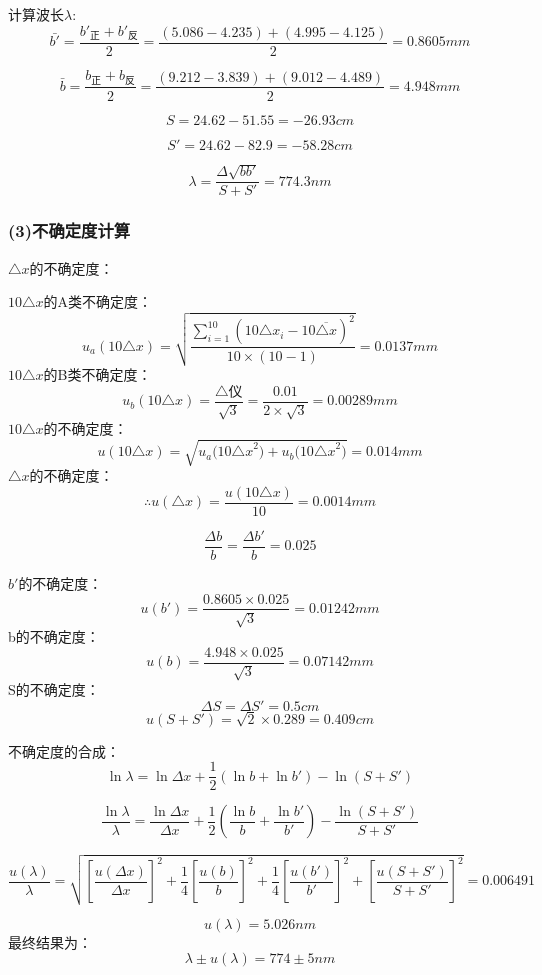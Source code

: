 \documentclass[11pt,a4paper,oneside]{article}
\begin{document}
计算波长$\lambda$:
$$\bar{b'} = \displaystyle\frac{b'_\text{正}+b'_\text{反}}{2} = \displaystyle\frac{ (5.086-4.235)+(4.995-4.125)}{2} = 0.8605mm$$

$$\bar{b} = \displaystyle\frac{b_\text{正}+b_\text{反}}{2} = \displaystyle\frac{ (9.212-3.839)+(9.012-4.489)}{2} = 4.948mm$$

$$ S = 24.62 - 51.55 = -26.93cm$$

$$ S' = 24.62 - 82.9 = -58.28cm$$

$$ {\lambda} = \displaystyle\frac{{\Delta}\sqrt{bb'}}{S+S'} = 774.3nm$$

\subsubsection*{(3)不确定度计算}
${\triangle}x$的不确定度：

$10{\triangle}x$的A类不确定度：
$$u_a(10{\triangle}x) = \sqrt{\displaystyle\frac{\sum\limits_{i=1}^{10} (10{{\triangle}x}_i-{10\overline{{\triangle}x}})^2}{10{\times}(10-1)}} = 0.0137mm$$
$10{\triangle}x$的B类不确定度：
$$u_b({10{\triangle}x})=\displaystyle\frac{\bigtriangleup\text{仪}}{\sqrt{3}}
= \frac{0.01}{2{\times}\sqrt{3}} = 0.00289mm$$
$10{\triangle}x$的不确定度：
$$u(10{\triangle}x)=\sqrt{{u_a(10{\triangle}x}^2)+{u_b(10{\triangle}x}^2)} = 0.014mm$$
${\triangle}x$的不确定度：
$${\therefore}u({\triangle}x) = \displaystyle\frac{u(10{\triangle}x)}{10} = 0.0014mm$$

$$ \displaystyle\frac{{\Delta}b}{b} = \displaystyle\frac{{\Delta}b'}{b} = 0.025 $$

$b'$的不确定度：
$$ u(b') = \displaystyle\frac{ 0.8605{\times}0.025}{\sqrt{3}} =0.01242mm$$
b的不确定度：
$$ u(b) = \displaystyle\frac{ 4.948{\times}0.025}{\sqrt{3}} =0.07142mm$$
S的不确定度：
$${\Delta}S = {\Delta}S' = 0.5cm$$
$$ u(S+S') = \sqrt{2} {\times} 0.289 = 0.409cm$$

不确定度的合成：
$$ \ln{\lambda} = \ln{{\Delta}x}+ \displaystyle\frac{1}{2}(\ln{b}+\ln{b'}) - \ln(S+S')$$

$$\displaystyle\frac{\ln{\lambda}}{\lambda} = \displaystyle\frac{\ln{\Delta}x}{{\Delta}x}+\displaystyle\frac{1}{2}(\displaystyle\frac{\ln{b}}{b}+\displaystyle\frac{\ln{b'}}{b'}) - \displaystyle\frac{\ln{(S+S')}}{S+S'} $$

$$\displaystyle\frac{u({\lambda})}{\lambda} = \sqrt{ [{\frac{u({\Delta}x)}{{\Delta}x}}]^2+\frac{1}{4}[{\frac{u(b)}{b}}]^2 +\frac{1}{4}[{\frac{u(b')}{b'}}]^2 + [\frac{u(S+S')}{S+S'}]^2   } = 0.006491$$

$$ u({\lambda}) = 5.026 nm$$
最终结果为：
$$ {\lambda}{\pm}{u({\lambda})} = 774 {\pm} 5 nm $$
\end{document}
